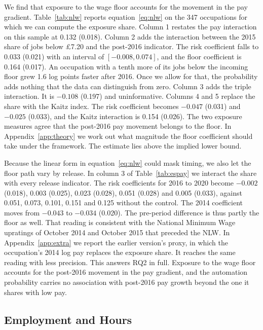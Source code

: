 \documentclass[12pt,leqno]{article}
\begin{document}
We find that exposure to the wage floor accounts for the movement in the pay gradient. Table~\ref{tab:nlw} reports equation~\eqref{eq:nlw} on the 347 occupations for which we can compute the exposure share. Column 1 restates the pay interaction on this sample at 0.132 (0.018). Column 2 adds the interaction between the 2015 share of jobs below \pounds 7.20 and the post-2016 indicator. The risk coefficient falls to 0.033 (0.021) with an interval of $[-0.008, 0.074]$, and the floor coefficient is 0.164 (0.017). An occupation with a tenth more of its jobs below the incoming floor grew 1.6 log points faster after 2016. Once we allow for that, the probability adds nothing that the data can distinguish from zero. Column 3 adds the triple interaction. It is $-0.108$ (0.197) and uninformative. Columns 4 and 5 replace the share with the Kaitz index. The risk coefficient becomes $-0.047$ (0.031) and $-0.025$ (0.033), and the Kaitz interaction is 0.154 (0.026). The two exposure measures agree that the post-2016 pay movement belongs to the floor. In Appendix~\ref{app:theory} we work out what magnitude the floor coefficient should take under the framework. The estimate lies above the implied lower bound.



Because the linear form in equation~\eqref{eq:nlw} could mask timing, we also let the floor path vary by release. In column 3 of Table~\ref{tab:espay} we interact the share with every release indicator. The risk coefficients for 2016 to 2020 become $-0.002$ (0.018), 0.003 (0.025), 0.023 (0.028), 0.051 (0.028) and 0.005 (0.033), against 0.051, 0.073, 0.101, 0.151 and 0.125 without the control. The 2014 coefficient moves from $-0.043$ to $-0.034$ (0.020). The pre-period difference is thus partly the floor as well. That reading is consistent with the National Minimum Wage upratings of October 2014 and October 2015 that preceded the NLW. In Appendix~\ref{app:extra} we report the earlier version's proxy, in which the occupation's 2014 log pay replaces the exposure share. It reaches the same reading with less precision. This answers RQ2 in full. Exposure to the wage floor accounts for the post-2016 movement in the pay gradient, and the automation probability carries no association with post-2016 pay growth beyond the one it shares with low pay.

\subsection{Employment and Hours}
\end{document}

